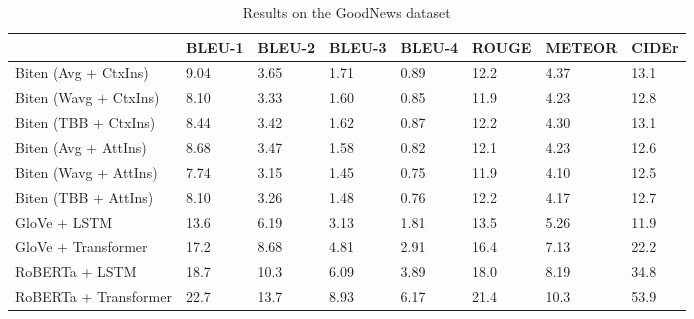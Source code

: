 \documentclass[10pt,twocolumn,letterpaper]{article}
\begin{document}
\begin{table}[t]
	\caption {Results on the GoodNews dataset}
	\label{tab:results-goodnews}
	\centering
	\begin{tabular}{llllllll}
		\toprule
		 & BLEU-1  & BLEU-2 & BLEU-3 & BLEU-4 & ROUGE & METEOR & CIDEr\\
      \midrule
      Biten (Avg + CtxIns) \cite{Biten2019GoodNews} & 9.04 & 3.65 & 1.71 & 0.89 & 12.2 & 4.37 & 13.1 \\
      Biten (Wavg + CtxIns) \cite{Biten2019GoodNews} & 8.10 & 3.33 & 1.60 & 0.85 & 11.9 & 4.23 & 12.8 \\
      Biten (TBB + CtxIns) \cite{Biten2019GoodNews} & 8.44 & 3.42 & 1.62 & 0.87 & 12.2 & 4.30 & 13.1 \\
      Biten (Avg + AttIns) \cite{Biten2019GoodNews} & 8.68 & 3.47 & 1.58 & 0.82 & 12.1 & 4.23 & 12.6 \\
      Biten (Wavg + AttIns) \cite{Biten2019GoodNews} & 7.74 & 3.15 & 1.45 & 0.75 & 11.9 & 4.10 & 12.5 \\
      Biten (TBB + AttIns) \cite{Biten2019GoodNews} & 8.10 & 3.26 & 1.48 & 0.76 & 12.2 & 4.17 & 12.7 \\
      \midrule
      GloVe + LSTM & 13.6 & 6.19 & 3.13 & 1.81 & 13.5 & 5.26 & 11.9 \\
      GloVe + Transformer & 17.2 & 8.68 & 4.81 & 2.91 & 16.4 & 7.13 & 22.2 \\
      RoBERTa + LSTM & 18.7  & 10.3 & 6.09 & 3.89  & 18.0  & 8.19 & 34.8  \\
      RoBERTa + Transformer & 22.7 & 13.7 & 8.93 & 6.17 & 21.4 & 10.3 & 53.9 \\
		\bottomrule
	\end{tabular}
\end{table}
\end{document}
